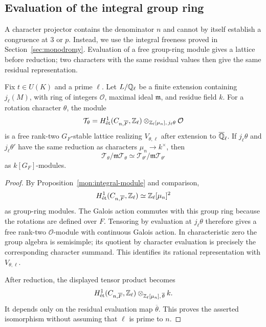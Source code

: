 \subsection{Evaluation of the integral group ring}

A character projector contains the denominator $n$ and cannot by
itself establish a congruence at $3$ or $p$.  Instead, we use the
integral freeness proved in Section~\ref{sec:monodromy}.  Evaluation
of a free group-ring module gives a lattice before reduction; two
characters with the same residual values then give the same
residual representation.

\begin{lemma}\label{sys:integral-evaluation}
Fix $t\in U(K)$ and a prime $\ell$.  Let $L/\mathbb Q_\ell$ be a finite
extension containing $j_\ell(M)$, with ring of integers
$\mathcal O$, maximal ideal $\mathfrak m$, and residue field $k$.
For a rotation character $\theta$, the module
\[
 \mathcal T_\theta=
 H^1_{\mathrm{\acute et}}(C_{n,\overline F},\mathbb Z_\ell)
 \otimes_{\mathbb Z_\ell[\mu_n],\,j_\ell\theta}\mathcal O
\]
is a free rank-two $G_F$-stable lattice realizing
$V_{\theta,\ell}$ after extension to $\overline{\mathbb Q}_\ell$.
If $j_\ell\theta$ and $j_\ell\theta'$ have the same reduction as
characters $\mu_n\to k^\times$, then
\[
 \mathcal T_\theta/\mathfrak m\mathcal T_\theta
 \simeq
 \mathcal T_{\theta'}/\mathfrak m\mathcal T_{\theta'}
\]
as $k[G_F]$-modules.
\end{lemma}

\begin{proof}
By Proposition~\ref{mon:integral-module} and comparison,
\[
 H^1_{\mathrm{\acute et}}(C_{n,\overline F},\mathbb Z_\ell)
 \simeq \mathbb Z_\ell[\mu_n]^2
\]
as group-ring modules.  The Galois action commutes with this group
ring because the rotations are defined over $F$.  Tensoring by
evaluation at $j_\ell\theta$ therefore gives a free rank-two
$\mathcal O$-module with continuous Galois action.  In characteristic
zero the group algebra is semisimple; its quotient by character
evaluation is precisely the corresponding character summand.
This identifies its rational representation with $V_{\theta,\ell}$.

After reduction, the displayed tensor product becomes
\[
 H^1_{\mathrm{\acute et}}(C_{n,\overline F},\mathbb Z_\ell)
 \otimes_{\mathbb Z_\ell[\mu_n],\,\overline\theta} k.
\]
It depends only on the residual evaluation map
$\overline\theta$.  This proves the asserted isomorphism without
assuming that $\ell$ is prime to $n$.
\end{proof}

